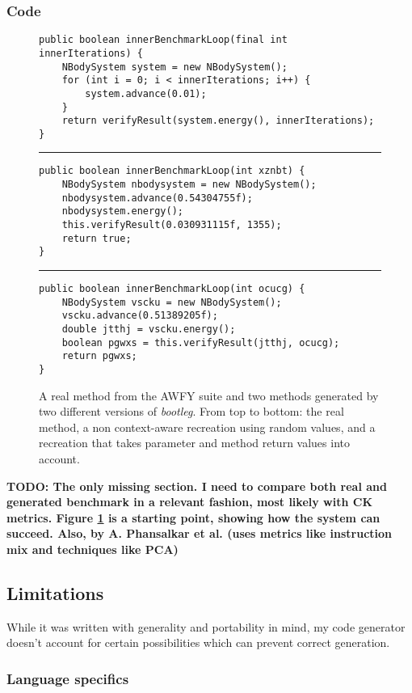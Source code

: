 \documentclass[12pt]{article}
\newcommand{\todo}[1]{\textbf{TODO: #1}}
\begin{document}
\subsubsection{Code}

\begin{figure}[h!]
\begin{lstlisting}
public boolean innerBenchmarkLoop(final int innerIterations) {
	NBodySystem system = new NBodySystem();
	for (int i = 0; i < innerIterations; i++) {
		system.advance(0.01);
	}
	return verifyResult(system.energy(), innerIterations);
}
\end{lstlisting}
\hrule 
\begin{lstlisting}
public boolean innerBenchmarkLoop(int xznbt) {
	NBodySystem nbodysystem = new NBodySystem();
	nbodysystem.advance(0.54304755f);
	nbodysystem.energy();
	this.verifyResult(0.030931115f, 1355);
	return true;
}
\end{lstlisting}
\hrule
\begin{lstlisting}
public boolean innerBenchmarkLoop(int ocucg) {
	NBodySystem vscku = new NBodySystem();
	vscku.advance(0.51389205f);
	double jtthj = vscku.energy();
	boolean pgwxs = this.verifyResult(jtthj, ocucg);
	return pgwxs;
}
\end{lstlisting}
\captionsetup{justification=centering}
\caption{A real method from the AWFY suite and two methods generated by two different versions of \textit{bootleg}. From top to bottom: the real method, a non context-aware recreation using random values, and a recreation that takes parameter and method return values into account.}
\label{fig:generation_method_example}
\end{figure}

\todo{The only missing section. I need to compare both real and generated benchmark in a relevant fashion, most likely with CK metrics. Figure \ref{fig:generation_method_example} is a starting point, showing how the system can succeed. Also, \cite{measuring-program-similarity} by A. Phansalkar et al. (uses metrics like instruction mix and techniques like PCA)}

\clearpage
\subsection{Limitations}
\label{section:limitations}
While it was written with generality and portability in mind, my code generator doesn't account for certain possibilities which can prevent correct generation.

\subsubsection{Language specifics}
\label{section:generator_improvements_language}
\end{document}
